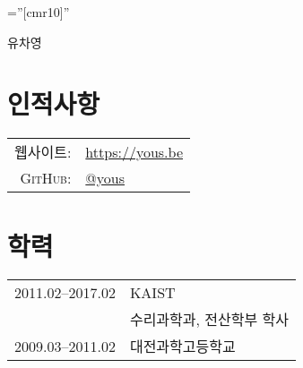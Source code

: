 \documentclass[a4paper,10pt]{article}
\begin{document}

\pagestyle{empty} %

\font\fb=''[cmr10]'' %

\par{\centering
  {\Huge 유차영
}\bigskip\par}

\section{인적사항}

\begin{tabular}{rl}
  \textsc{웹사이트:} & \url{https://yous.be} \\
  \textsc{GitHub:}   & \href{https://github.com/yous}{@yous} \\
\end{tabular}

\section{학력}
\begin{tabular}{rl}
  2011.02--2017.02 & KAIST \\
                   & \textsc{수리과학과}, \textsc{전산학부} 학사 \\
  2009.03--2011.02 & 대전과학고등학교
\end{tabular}

\end{document}
